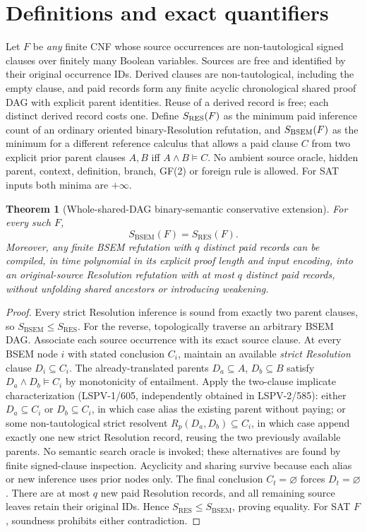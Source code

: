 \documentclass[11pt]{article}
\newtheorem{theorem}{Theorem}
\begin{document}
\section*{Definitions and exact quantifiers}
Let $F$ be \emph{any} finite CNF whose source occurrences are non-tautological signed clauses over finitely many Boolean variables. Sources are free and identified by their original occurrence IDs. Derived clauses are non-tautological, including the empty clause, and paid records form any finite acyclic chronological shared proof DAG with explicit parent identities. Reuse of a derived record is free; each distinct derived record costs one.
Define $S_{\rm RES}(F)$ as the minimum paid inference count of an ordinary oriented binary-Resolution refutation, and $S_{\rm BSEM}(F)$ as the minimum for a different reference calculus that allows a paid clause $C$ from two explicit prior parent clauses $A,B$ iff $A\wedge B\models C$. No ambient source oracle, hidden parent, context, definition, branch, GF(2) or foreign rule is allowed. For SAT inputs both minima are $+\infty$.
\begin{theorem}[Whole-shared-DAG binary-semantic conservative extension]
For every such $F$,
\[
\boxed{S_{\mathrm{BSEM}}(F)=S_{\mathrm{RES}}(F).}
\]
Moreover, any finite BSEM refutation with $q$ distinct paid records can be compiled, in time polynomial in its explicit proof length and input encoding, into an original-source Resolution refutation with at most $q$ distinct paid records, without unfolding shared ancestors or introducing weakening.
\end{theorem}
\begin{proof}
Every strict Resolution inference is sound from exactly two parent clauses, so $S_{\mathrm{BSEM}}\le S_{\mathrm{RES}}$. For the reverse, topologically traverse an arbitrary BSEM DAG. Associate each source occurrence with its exact source clause. At every BSEM node $i$ with stated conclusion $C_i$, maintain an available \emph{strict Resolution} clause $D_i\subseteq C_i$. The already-translated parents $D_a\subseteq A$, $D_b\subseteq B$ satisfy $D_a\wedge D_b\models C_i$ by monotonicity of entailment. Apply the two-clause implicate characterization (LSPV-1/605, independently obtained in LSPV-2/585): either $D_a\subseteq C_i$ or $D_b\subseteq C_i$, in which case alias the existing parent without paying; or some non-tautological strict resolvent $R_p(D_a,D_b)\subseteq C_i$, in which case append exactly one new strict Resolution record, reusing the two previously available parents. No semantic search oracle is invoked; these alternatives are found by finite signed-clause inspection. Acyclicity and sharing survive because each alias or new inference uses prior nodes only. The final conclusion $C_t=\varnothing$ forces $D_t=\varnothing$. There are at most $q$ new paid Resolution records, and all remaining source leaves retain their original IDs. Hence $S_{\mathrm{RES}}\le S_{\mathrm{BSEM}}$, proving equality. For SAT $F$, soundness prohibits either contradiction.
\end{proof}
\end{document}
